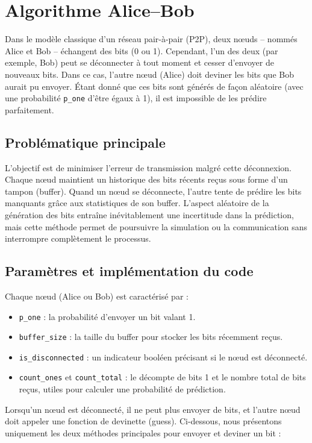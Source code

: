 \documentclass[a4paper,12pt]{article}
\begin{document}
\section{Algorithme Alice--Bob}

Dans le modèle classique d'un réseau pair-à-pair (P2P), deux nœuds -- nommés Alice et Bob -- échangent des bits (0 ou 1). Cependant, l'un des deux (par exemple, Bob) peut se déconnecter à tout moment et cesser d'envoyer de nouveaux bits. Dans ce cas, l'autre nœud (Alice) doit deviner les bits que Bob aurait pu envoyer. Étant donné que ces bits sont générés de façon aléatoire (avec une probabilité \texttt{p\_one} d'être égaux à 1), il est impossible de les prédire parfaitement.

\subsection{Problématique principale}
L'objectif est de minimiser l'erreur de transmission malgré cette
déconnexion. Chaque nœud maintient un historique des bits récents reçus sous forme d'un tampon (buffer). Quand un nœud se déconnecte, l'autre tente de prédire les bits manquants grâce aux statistiques de son buffer. L'aspect aléatoire de la génération des bits entraîne inévitablement une incertitude dans la prédiction, mais cette méthode permet de poursuivre la simulation ou la communication sans interrompre complètement le processus.

\subsection{Paramètres et implémentation du code}
Chaque nœud (Alice ou Bob) est caractérisé par :
\begin{itemize}
  \item \texttt{p\_one} : la probabilité d'envoyer un bit valant 1.
  \item \texttt{buffer\_size} : la taille du buffer pour stocker
        les bits récemment reçus.
  \item \texttt{is\_disconnected} : un indicateur booléen précisant
        si le nœud est déconnecté.
  \item \texttt{count\_ones} et \texttt{count\_total} : le décompte
        de bits 1 et le nombre total de bits reçus, utiles pour
        calculer une probabilité de prédiction.
\end{itemize}

Lorsqu'un nœud est déconnecté, il ne peut plus envoyer de bits, et l'autre nœud doit appeler une fonction de \og devinette \fg{} (guess). Ci-dessous, nous présentons uniquement les deux méthodes principales pour envoyer et deviner un bit :
\end{document}
